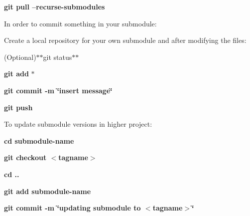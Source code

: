 {\bfseries git pull --recurse-\/submodules}

In order to commit something in your submodule\+:

Create a local repository for your own submodule and after modifying the files\+:

(Optional)$\ast$$\ast$git status$\ast$$\ast$

{\bfseries git add} $\ast$

{\bfseries git commit -\/m \char`\"{}insert message\char`\"{}}

{\bfseries git push}

To update submodule versions in higher project\+:

{\bfseries cd submodule-\/name}

{\bfseries git checkout $<$tagname$>$}

{\bfseries cd ..}

{\bfseries git add submodule-\/name}

{\bfseries git commit -\/m \char`\"{}updating submodule to $<$tagname$>$\char`\"{}} 